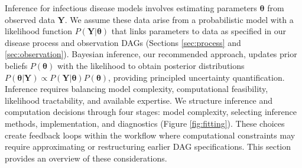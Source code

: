 \documentclass{article}
\begin{document}
Inference for infectious disease models involves estimating parameters $\boldsymbol{\theta}$ from observed data $\boldsymbol{Y}$.
We assume these data arise from a probabilistic model with a likelihood function $P(\boldsymbol{Y} |
  \boldsymbol{\theta})$ that links parameters to data as specified in our disease process and observation DAGs (Sections \ref{sec:process} and \ref{sec:observation}).
Bayesian inference, our recommended approach, updates prior beliefs $P(\boldsymbol{\theta})$ with the likelihood to obtain posterior distributions $P(\boldsymbol{\theta} | \boldsymbol{Y}) \propto P(\boldsymbol{Y}|\boldsymbol{\theta}) P(\boldsymbol{\theta})$, providing principled uncertainty quantification.
Inference requires balancing model complexity, computational feasibility, likelihood tractability, and available expertise.
We structure inference and computation decisions through four stages: model complexity, selecting inference methods, implementation, and diagnostics (Figure \ref{fig:fitting}). 
These choices create feedback loops within the workflow where computational constraints may require approximating or restructuring earlier DAG specifications.
This section provides an overview of these considerations.
\end{document}
